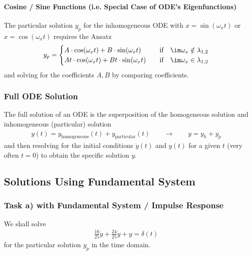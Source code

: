 \paragraph{Cosine / Sine Functions (i.e. Special Case of ODE's Eigenfunctions)}
\label{Sec:CosSineAnsatzInhomo}
The particular solution $y_p$ for the inhomogeneous ODE with
$x=\sin(\omega_x t)$ or $x=\cos(\omega_x t)$
requires the Ansatz
\begin{align}
y_p =
\begin{cases}
A \cdot \cos(\omega_x t) + B \cdot \sin(\omega_x t)&\quad \text{if}
\quad \im \omega_x \notin \lambda_{1,2}\\
A t \cdot \cos(\omega_x t) + B t \cdot \sin(\omega_x t)&\quad \text{if}
\quad \im \omega_x \in \lambda_{1,2}
\end{cases}
\end{align}
and solving for the coefficients $A, B$ by comparing coefficients.



\subsubsection{Full ODE Solution}
The full solution of an ODE is the superposition of the homogeneous solution
and inhomogeneous (particular) solution
\begin{align}
y(t) = y_\text{homogeneous}(t)+y_\text{particular}(t) \qquad \rightarrow \qquad
y = y_h + y_p
\end{align}
and then resolving for the initial conditions $\dot{y}(t)$ and $y(t)$ for a
given $t$ (very often $t=0$) to obtain the specific solution $y$.



\newpage
\subsection{Solutions Using Fundamental System}
\label{sec:SolutionsUsingFundameltalSystem}


\subsubsection{Task a) with Fundamental System / Impulse Response}
We shall solve
\begin{align}
\frac{16}{25} \ddot{y} + \frac{24}{25} \dot{y} + y = \delta(t)
\end{align}
for the particular solution $y_p$ in the time domain.

